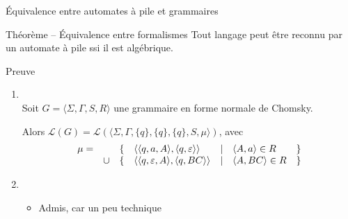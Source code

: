 \begin{frame}{Équivalence entre automates à pile et grammaires}
  \small 
  \begin{block}{Théorème -- Équivalence entre formalismes}
    Tout langage peut être reconnu par un automate à pile ssi il est algébrique. 
  \end{block}
  
  \begin{block}{Preuve}
    \begin{enumerate}
    \item {}\\
      
      Soit $G = \langle \Sigma, \Gamma, S, R\rangle$ une grammaire en forme normale de Chomsky.
      
      Alors $\mathcal{L}(G) = \mathcal{L}(\langle \Sigma, \Gamma, \{q\}, \{q\}, \{q\}, S, \mu \rangle)$, avec
      $$\begin{array}[t]{lllllll}
        \mu = &&\{& \langle \langle q, a, A \rangle, \langle q, \varepsilon \rangle\rangle &|& \langle A, a \rangle \in R &\}\\
        &\cup  &\{& \langle \langle q, \varepsilon, A \rangle, \langle q, BC \rangle\rangle &|& \langle A, BC \rangle \in R &\}\\
      \end{array}$$
      \begin{center}
      \end{center}

      
    \item {}
      \begin{itemize}
      \item Admis, car un peu technique
      \end{itemize}
    \end{enumerate}
  \end{block}
\end{frame}



